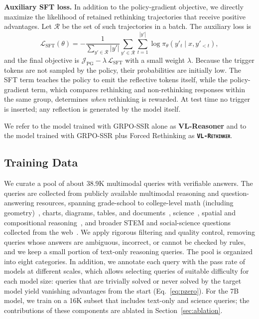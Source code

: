 \documentclass{article}
\newcommand{\model}{\texttt{\textsc{VL-Rethinker}}\xspace}
\begin{document}
\textbf{Auxiliary SFT loss.} In addition to the policy-gradient objective, we directly maximize the likelihood of retained rethinking trajectories that receive positive advantages. Let $\mathcal{R}$ be the set of such trajectories in a batch. The auxiliary loss is
\begin{equation}
    \mathcal{L}_\text{SFT}(\theta) = -\frac{1}{\sum_{y'\in\mathcal{R}}|y'|}\sum_{y'\in\mathcal{R}}\sum_{t=1}^{|y'|}\log \pi_\theta(y'_t\mid x, y'_{<t}),
    \label{eq:sft}
\end{equation}
and the final objective is $\mathcal{J}_\text{PG} - \lambda\,\mathcal{L}_\text{SFT}$ with a small weight $\lambda$. Because the trigger tokens are not sampled by the policy, their probabilities are initially low. The SFT term teaches the policy to emit the reflective tokens itself, while the policy-gradient term, which compares rethinking and non-rethinking responses within the same group, determines \emph{when} rethinking is rewarded. At test time no trigger is inserted; any reflection is generated by the model itself.

We refer to the model trained with GRPO-SSR alone as \textbf{VL-Reasoner} and to the model trained with GRPO-SSR plus Forced Rethinking as \textbf{\model}.

\subsection{Training Data}
\label{sec:data}

We curate a pool of about 38.9K multimodal queries with verifiable answers. The queries are collected from publicly available multimodal reasoning and question-answering resources, spanning grade-school to college-level math (including geometry)~\cite{GeoQA,gllava,shi2024mathllavabootstrappingmathematicalreasoning,amini2019mathqainterpretablemathword}, charts, diagrams, tables, and documents~\cite{masry2022chartqa,chang2022mapqa,figureqa,ai2d,docvqa,lu2021iconqa}, science~\cite{saikh2022scienceqa}, spatial and compositional reasoning~\cite{johnson2017clevr,hudson2019gqa}, and broader STEM and social-science questions collected from the web~\cite{visualwebinstruct,mammothvl}. We apply rigorous filtering and quality control, removing queries whose answers are ambiguous, incorrect, or cannot be checked by rules, and we keep a small portion of text-only reasoning queries. The pool is organized into eight categories. In addition, we annotate each query with the pass rate of models at different scales, which allows selecting queries of suitable difficulty for each model size: queries that are trivially solved or never solved by the target model yield vanishing advantages from the start (Eq.~\ref{eq:pzero}). For the 7B model, we train on a 16K subset that includes text-only and science queries; the contributions of these components are ablated in Section~\ref{sec:ablation}.
\end{document}
